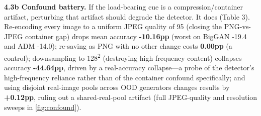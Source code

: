 \textbf{4.3b Confound battery.} If the load-bearing cue is a compression/container artifact, perturbing that artifact should degrade the detector. It does (Table 3). Re-encoding every image to a uniform JPEG quality of 95 (closing the PNG-vs-JPEG container gap) drops mean accuracy \textbf{-10.16pp} (worst on BigGAN -19.4 and ADM -14.0); re-saving as PNG with no other change costs \textbf{0.00pp} (a control); downsampling to 128\textsuperscript{2} (destroying high-frequency content) collapses accuracy \textbf{-44.64pp}, driven by a real-accuracy collapse---a probe of the detector's high-frequency reliance rather than of the container confound specifically; and using disjoint real-image pools across OOD generators changes results by \textbf{+0.12pp}, ruling out a shared-real-pool artifact (full JPEG-quality and resolution sweeps in \autoref{fig:confound}).





